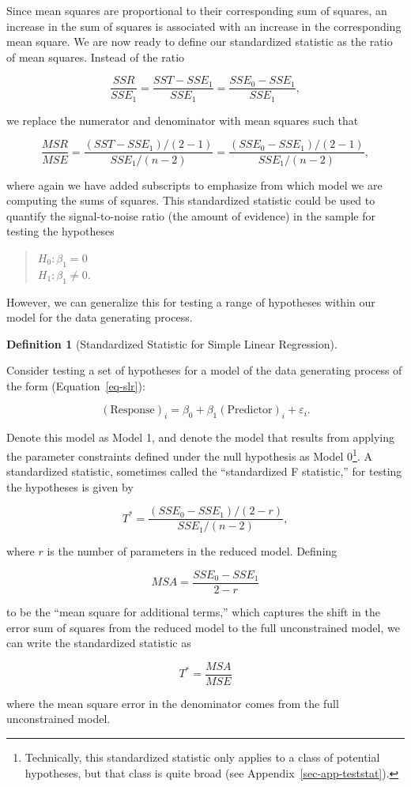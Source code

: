 \documentclass[
  letterpaper,
  DIV=11,
  numbers=noendperiod]{scrreprt}
\theoremstyle{definition}
\newtheorem{definition}{Definition}[chapter]
\theoremstyle{definition}
\theoremstyle{plain}
\theoremstyle{remark}
\begin{document}
Since mean squares are proportional to their corresponding sum of
squares, an increase in the sum of squares is associated with an
increase in the corresponding mean square. We are now ready to define
our standardized statistic as the ratio of mean squares. Instead of the
ratio

\[\frac{SSR}{SSE_1} = \frac{SST - SSE_1}{SSE_1} = \frac{SSE_0 - SSE_1}{SSE_1},\]

we replace the numerator and denominator with mean squares such that

\[\frac{MSR}{MSE} = \frac{\left(SST - SSE_1\right)/(2 - 1)}{SSE_1/(n - 2)} = \frac{\left(SSE_0 - SSE_1\right)/(2 - 1)}{SSE_1/(n - 2)},\]

where again we have added subscripts to emphasize from which model we
are computing the sums of squares. This standardized statistic could be
used to quantify the signal-to-noise ratio (the amount of evidence) in
the sample for testing the hypotheses

\begin{quote}
\(H_0: \beta_1 = 0\)\\
\(H_1: \beta_1 \neq 0.\)
\end{quote}

However, we can generalize this for testing a range of hypotheses within
our model for the data generating process.

\begin{definition}[Standardized Statistic for Simple Linear
Regression]\protect\hypertarget{def-standard-f}{}\label{def-standard-f}

Consider testing a set of hypotheses for a model of the data generating
process of the form (Equation~\ref{eq-slr}):

\[(\text{Response})_i = \beta_0 + \beta_1(\text{Predictor})_i + \varepsilon_i.\]

Denote this model as Model 1, and denote the model that results from
applying the parameter constraints defined under the null hypothesis as
Model 0\footnote{Technically, this standardized statistic only applies
  to a class of potential hypotheses, but that class is quite broad (see
  Appendix~\ref{sec-app-teststat}).}. A standardized statistic,
sometimes called the ``standardized F statistic,'' for testing the
hypotheses is given by

\[T^* = \frac{\left(SSE_0 - SSE_1\right) / (2 - r)}{SSE_1 / (n - 2)},\]

where \(r\) is the number of parameters in the reduced model. Defining

\[MSA = \frac{SSE_0 - SSE_1}{2 - r}\]

to be the ``mean square for additional terms,'' which captures the shift
in the error sum of squares from the reduced model to the full
unconstrained model, we can write the standardized statistic as

\[T^* = \frac{MSA}{MSE}\]

where the mean square error in the denominator comes from the full
unconstrained model.

\end{definition}
\end{document}
